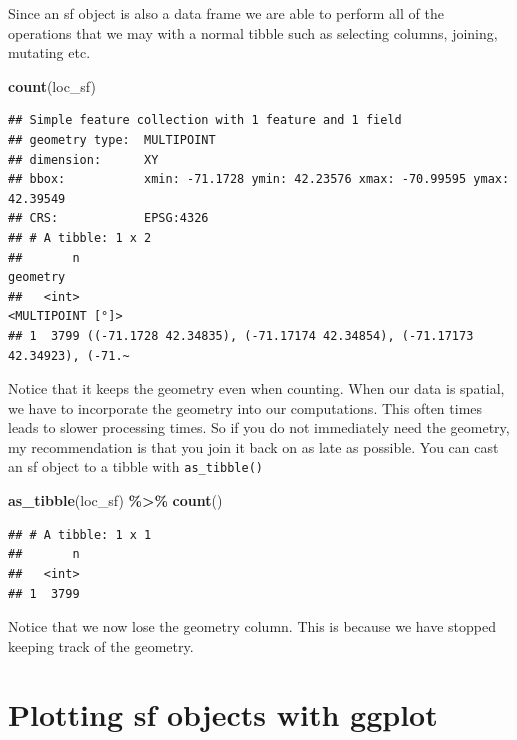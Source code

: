 \documentclass[
]{book}
\newenvironment{Shaded}{\begin{snugshade}}{\end{snugshade}}
\newcommand{\KeywordTok}[1]{\textcolor[rgb]{0.13,0.29,0.53}{\textbf{#1}}}
\newcommand{\NormalTok}[1]{#1}
\newcommand{\OperatorTok}[1]{\textcolor[rgb]{0.81,0.36,0.00}{\textbf{#1}}}
\newcommand{\StringTok}[1]{\textcolor[rgb]{0.31,0.60,0.02}{#1}}
\begin{document}
Since an sf object is also a data frame we are able to perform all of the operations that we may with a normal tibble such as selecting columns, joining, mutating etc.

\begin{Shaded}
\begin{Highlighting}[]
\KeywordTok{count}\NormalTok{(loc\_sf)}
\end{Highlighting}
\end{Shaded}

\begin{verbatim}
## Simple feature collection with 1 feature and 1 field
## geometry type:  MULTIPOINT
## dimension:      XY
## bbox:           xmin: -71.1728 ymin: 42.23576 xmax: -70.99595 ymax: 42.39549
## CRS:            EPSG:4326
## # A tibble: 1 x 2
##       n                                                                 geometry
##   <int>                                                         <MULTIPOINT [°]>
## 1  3799 ((-71.1728 42.34835), (-71.17174 42.34854), (-71.17173 42.34923), (-71.~
\end{verbatim}

Notice that it keeps the geometry even when counting. When our data is spatial, we have to incorporate the geometry into our computations. This often times leads to slower processing times. So if you do not immediately need the geometry, my recommendation is that you join it back on as late as possible. You can cast an sf object to a tibble with \texttt{as\_tibble()}

\begin{Shaded}
\begin{Highlighting}[]
\KeywordTok{as\_tibble}\NormalTok{(loc\_sf) }\OperatorTok{\%\textgreater{}\%}\StringTok{ }
\StringTok{  }\KeywordTok{count}\NormalTok{()}
\end{Highlighting}
\end{Shaded}

\begin{verbatim}
## # A tibble: 1 x 1
##       n
##   <int>
## 1  3799
\end{verbatim}

Notice that we now lose the geometry column. This is because we have stopped keeping track of the geometry.

\hypertarget{plotting-sf-objects-with-ggplot}{%
\section{Plotting sf objects with ggplot}\label{plotting-sf-objects-with-ggplot}}
\end{document}
